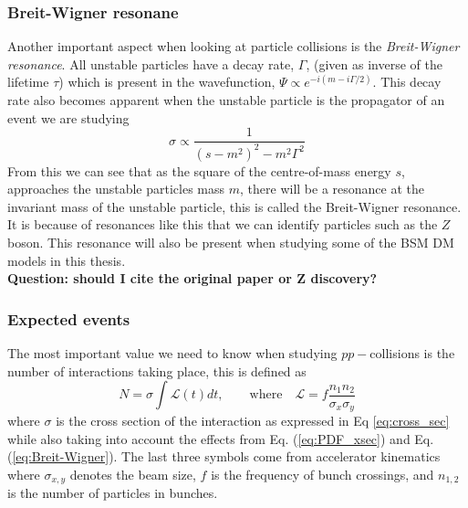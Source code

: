 \documentclass[12pt, a4paper]{book}
\begin{document}
\subsubsection{Breit-Wigner resonane}
Another important aspect when looking at particle collisions is the \textit{Breit-Wigner resonance}. All unstable particles have a decay rate, $\Gamma$, (given as inverse of the lifetime $\tau$) which is present in the wavefunction, 
$\Psi \propto e^{-i(m-i\Gamma/2)}$. This decay rate also becomes apparent when the unstable particle is the propagator of an event we are studying 
\begin{equation}\label{eq:Breit-Wigner}
    \sigma \propto\frac{1}{(s-m^2)^2-m^2\Gamma^2}
\end{equation}
From this we can see that as the square of the centre-of-mass energy $s$, approaches the unstable particles mass $m$, there will be a resonance at the invariant mass of the unstable particle, this is called the Breit-Wigner resonance. 
It is because of resonances like this that we can identify particles such as the $Z$ boson. This resonance will also be present when studying some of the BSM DM models in this thesis.\\
\textbf{ Question: should I cite the original paper or Z discovery?}


\subsubsection{Expected events}
The most important value we need to know when studying $pp-$collisions is the number of interactions taking place, this is defined as
\begin{equation}\label{eq:expected_events}
    N=\sigma\int\mathcal{L}(t)dt, \qquad\text{where}\quad \mathcal{L}=f\frac{n_1n_2}{\sigma_x\sigma_y}
\end{equation}
where $\sigma$ is the cross section of the interaction as expressed in Eq \ref{eq:cross_sec} while also taking into account the effects from Eq. (\ref{eq:PDF_xsec}) and Eq. (\ref{eq:Breit-Wigner}).
The last three symbols come from accelerator kinematics where $\sigma_{x,y}$ denotes the beam size, $f$ is the frequency of bunch crossings, and $n_{1,2}$ is the number of particles in bunches.





\clearpage
\end{document}
